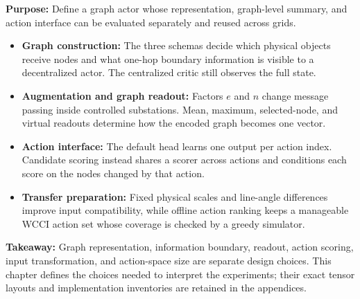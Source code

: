\begin{tcolorbox}[
  colframe=red!75!black,
  colback=red!5!white,
  title={Chapter Summary}
]
\color{black}
\textbf{Purpose:} Define a graph actor whose representation, graph-level
summary, and action interface can be evaluated separately and reused across
grids.

\begin{itemize}
  \item \textbf{Graph construction:} The three schemas decide which physical
  objects receive nodes and what one-hop boundary information is visible to a
  decentralized actor. The centralized critic still observes the full state.
  \item \textbf{Augmentation and graph readout:} Factors $e$ and $n$ change
  message passing inside controlled substations. Mean, maximum, selected-node,
  and virtual readouts determine how the encoded graph becomes one vector.
  \item \textbf{Action interface:} The default head learns one output per
  action index. Candidate scoring instead shares a scorer across actions and
  conditions each score on the nodes changed by that action.
  \item \textbf{Transfer preparation:} Fixed physical scales and line-angle
  differences improve input compatibility, while offline action ranking keeps
  a manageable WCCI action set whose coverage is checked by a greedy simulator.
\end{itemize}

\textbf{Takeaway:} Graph representation, information boundary, readout,
action scoring, input transformation, and action-space size are separate design
choices. This chapter defines the choices needed to interpret the experiments;
their exact tensor layouts and implementation inventories are retained in the
appendices.
\end{tcolorbox}
